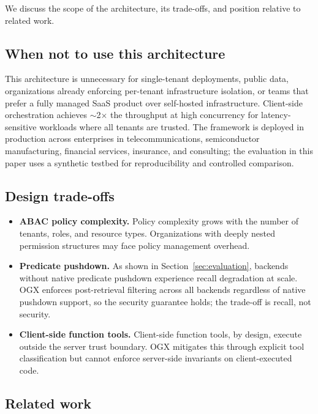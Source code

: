 \documentclass[sigconf]{acmart}
\begin{document}
We discuss the scope of the architecture, its trade-offs, and position relative to related work.

\subsection{When not to use this architecture}
This architecture is unnecessary for single-tenant deployments, public data, organizations already enforcing per-tenant infrastructure isolation, or teams that prefer a fully managed SaaS product over self-hosted infrastructure. Client-side orchestration achieves ${\sim}$2$\times$ the throughput at high concurrency for latency-sensitive workloads where all tenants are trusted. The framework is deployed in production across enterprises in telecommunications, semiconductor manufacturing, financial services, insurance, and consulting; the evaluation in this paper uses a synthetic testbed for reproducibility and controlled comparison.

\subsection{Design trade-offs}

\begin{itemize}
  \item \textbf{ABAC policy complexity.} Policy complexity grows with the number of tenants, roles, and resource types. Organizations with deeply nested permission structures may face policy management overhead.

  \item \textbf{Predicate pushdown.} As shown in Section~\ref{sec:evaluation}, backends without native predicate pushdown experience recall degradation at scale. OGX enforces post-retrieval filtering across all backends regardless of native pushdown support, so the security guarantee holds; the trade-off is recall, not security.

  \item \textbf{Client-side function tools.} Client-side function tools, by design, execute outside the server trust boundary. OGX mitigates this through explicit tool classification but cannot enforce server-side invariants on client-executed code.
\end{itemize}

\subsection{Related work}
\end{document}
